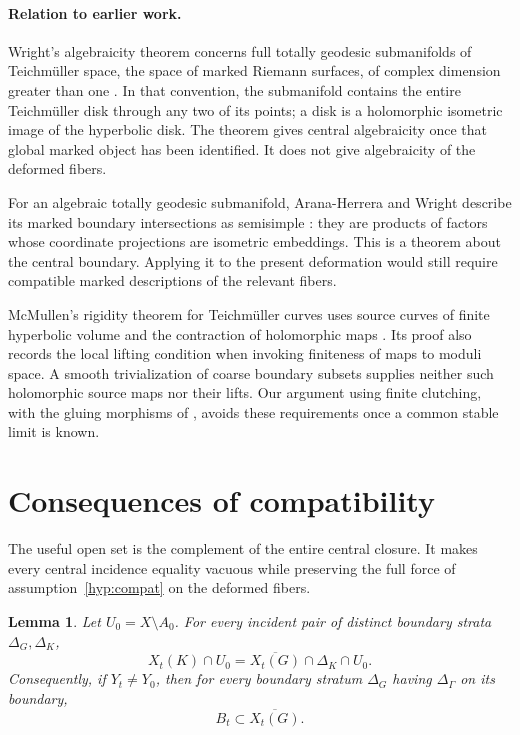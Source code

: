 \documentclass[11pt]{article}
\newcommand{\cl}[1]{\overline{#1}}
\newtheorem{lemma}[theorem]{Lemma}
\theoremstyle{definition}
\theoremstyle{remark}
\begin{document}
\paragraph{Relation to earlier work.}
Wright's algebraicity theorem concerns full totally geodesic submanifolds of Teichm\"uller space, the space of marked Riemann surfaces, of complex dimension greater than one \cite[Theorem~1.1]{Wright}. In that convention, the submanifold contains the entire Teichm\"uller disk through any two of its points; a disk is a holomorphic isometric image of the hyperbolic disk. The theorem gives central algebraicity once that global marked object has been identified. It does not give algebraicity of the deformed fibers.

For an algebraic totally geodesic submanifold, Arana-Herrera and Wright describe its marked boundary intersections as semisimple \cite[Theorem~1.3]{AW}: they are products of factors whose coordinate projections are isometric embeddings. This is a theorem about the central boundary. Applying it to the present deformation would still require compatible marked descriptions of the relevant fibers.

McMullen's rigidity theorem for Teichm\"uller curves uses source curves of finite hyperbolic volume and the contraction of holomorphic maps \cite[Theorem~1 and its proof]{McMullen}. Its proof also records the local lifting condition when invoking finiteness of maps to moduli space. A smooth trivialization of coarse boundary subsets supplies neither such holomorphic source maps nor their lifts. Our argument using finite clutching, with the gluing morphisms of \cite[Definition~4.1 and Proposition~4.4]{EF}, avoids these requirements once a common stable limit is known.

\section{Consequences of compatibility}\label{sec:compat}

The useful open set is the complement of the entire central closure. It makes every central incidence equality vacuous while preserving the full force of assumption~\ref{hyp:compat} on the deformed fibers.

\begin{lemma}\label{lem:outside}
Let $U_0=X\setminus A_0$. For every incident pair of distinct boundary strata $\Delta_G,\Delta_K$,
\begin{equation}\label{eq:outside}
 X_t(K)\cap U_0=\cl{X_t(G)}\cap\Delta_K\cap U_0.
\end{equation}
Consequently, if $Y_t\ne Y_0$, then for every boundary stratum $\Delta_G$ having $\Delta_\Gamma$ on its boundary,
\begin{equation}\label{eq:moving}
 B_t\subset\cl{X_t(G)}.
\end{equation}
\end{lemma}
\end{document}
